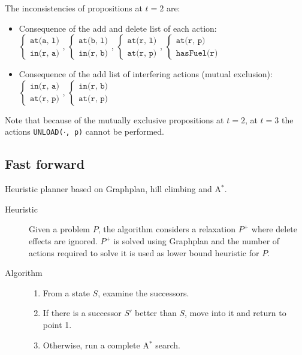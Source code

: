\begin{example}
    The inconsistencies of propositions at $t=2$ are:
    \begin{itemize}
        \item Consequence of the add and delete list of each action:\\[0.3em]
            $\begin{cases}\texttt{at(a, l)} \\ \texttt{in(r, a)}\end{cases}$,
            $\begin{cases}\texttt{at(b, l)} \\ \texttt{in(r, b)}\end{cases}$,
            $\begin{cases}\texttt{at(r, l)} \\ \texttt{at(r, p)}\end{cases}$,
            $\begin{cases}\texttt{at(r, p)} \\ \texttt{hasFuel(r)}\end{cases}$\\[0.5em]
        \item Consequence of the add list of interfering actions (mutual exclusion):\\[0.3em]
            $\begin{cases}\texttt{in(r, a)} \\ \texttt{at(r, p)}\end{cases}$,
            $\begin{cases}\texttt{in(r, b)} \\ \texttt{at(r, p)}\end{cases}$
    \end{itemize}

    Note that because of the mutually exclusive propositions at $t=2$, 
    at $t=3$ the actions \texttt{UNLOAD($\cdot$, p)} cannot be performed.
\end{example}


\subsection{Fast forward}
Heuristic planner based on Graphplan, hill climbing and A$^*$.

\begin{description}
    \item[Heuristic]
        Given a problem $P$, the algorithm considers a relaxation $P^+$ 
        where delete effects are ignored.
        $P^+$ is solved using Graphplan and the number of actions required to solve it is used as lower bound heuristic for $P$.

    \item[Algorithm] \phantom{}
        \begin{enumerate}
            \item From a state $S$, examine the successors.
            \item If there is a successor $S'$ better than $S$, move into it and return to point 1.
            \item Otherwise, run a complete A$^*$ search.
        \end{enumerate}
\end{description}
